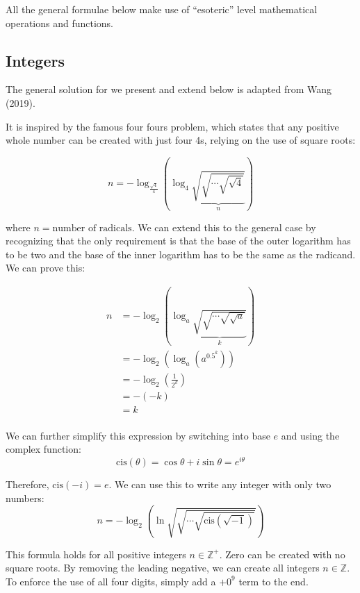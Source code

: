 All the general formulae below make use of ``esoteric'' level mathematical operations and functions.

\subsection{Integers}

The general solution for we present and extend below is adapted from Wang (2019).

It is inspired by the famous four fours problem, which states that any positive whole number can be created with just four 4s, relying on the use of square roots:

\begin{equation}
  n = -\log_\frac{\sqrt{4}}{4}\left( \log_4 \underbrace{\sqrt{\sqrt{\cdots\sqrt{\sqrt{4}}}}}_{n} \right)
\end{equation}

where $n=\textrm{number of radicals}$.
We can extend this to the general case by recognizing that the only requirement is that the base of the outer logarithm has to be two and the base of the inner logarithm has to be the same as the radicand.
We can prove this:

\begin{align*}
  n &= -\log_2\left(\log_a \underbrace{\sqrt{\sqrt{\cdots\sqrt{\sqrt{a}}}}}_{k} \right) \\
  &= -\log_2\left(\log_a \left(a^{0.5^k}\right)\right) \\
  &= -\log_2\left(\frac{1}{2^k}\right) \\
  &= -(-k) \\
  &= k \\
\end{align*}

We can further simplify this expression by switching into base $e$ and using the complex function:
\begin{equation*}
  \mathrm{cis}(\theta) = \cos\theta + i\sin\theta = e^{i\theta}
\end{equation*}

Therefore, $\mathrm{cis}(-i)=e$.
We can use this to write any integer with only two numbers:
\begin{equation}
  n = -\log_2\left( \ln \sqrt{\sqrt{\cdots\sqrt{\mathrm{cis}(\sqrt{-1})}}}\right)
\end{equation}

This formula holds for all positive integers $n\in\mathbb{Z}^+$.
Zero can be created with no square roots.
By removing the leading negative, we can create all integers $n\in\mathbb{Z}$.
To enforce the use of all four digits, simply add a $+0^9$ term to the end.

